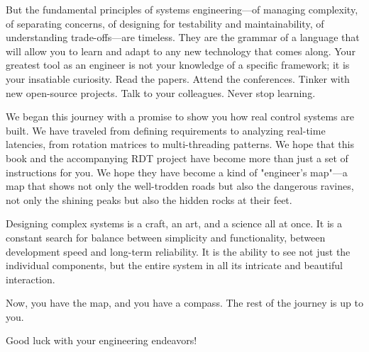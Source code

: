 But the fundamental principles of systems engineering—of managing complexity, of separating concerns, of designing for testability and maintainability, of understanding trade-offs—are timeless. They are the grammar of a language that will allow you to learn and adapt to any new technology that comes along. Your greatest tool as an engineer is not your knowledge of a specific framework; it is your insatiable curiosity. Read the papers. Attend the conferences. Tinker with new open-source projects. Talk to your colleagues. Never stop learning.

We began this journey with a promise to show you how real control systems are built. We have traveled from defining requirements to analyzing real-time latencies, from rotation matrices to multi-threading patterns. We hope that this book and the accompanying RDT project have become more than just a set of instructions for you. We hope they have become a kind of "engineer's map"—a map that shows not only the well-trodden roads but also the dangerous ravines, not only the shining peaks but also the hidden rocks at their feet.

Designing complex systems is a craft, an art, and a science all at once. It is a constant search for balance between simplicity and functionality, between development speed and long-term reliability. It is the ability to see not just the individual components, but the entire system in all its intricate and beautiful interaction.

Now, you have the map, and you have a compass. The rest of the journey is up to you.

Good luck with your engineering endeavors!

